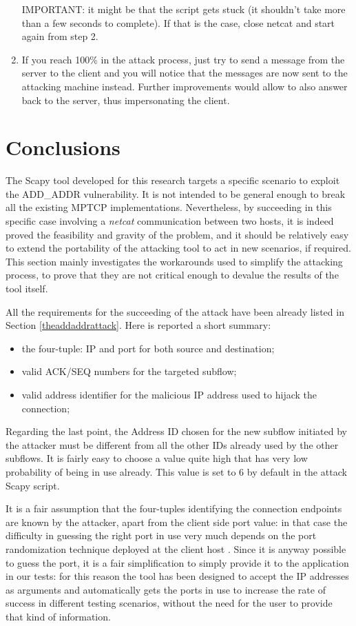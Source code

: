 \begin{enumerate}
    IMPORTANT: it might be that the script gets stuck (it shouldn't take more than a few seconds to complete). If that is the case, close netcat and start again from step 2.
\item
    If you reach 100\% in the attack process, just try to send a message from the server to the client and you will notice that the messages are now sent to the attacking machine instead. Further improvements would allow to also answer back to the server, thus impersonating the client.
\end{enumerate} 


\section{Conclusions} 
\label{limitationsandfuturework}
The Scapy tool developed for this research targets a specific scenario to exploit the ADD\_ADDR vulnerability. It is not intended to be general enough to break all the existing MPTCP implementations. Nevertheless, by succeeding in this specific case involving a \textit{netcat} communication between two hosts, it is indeed proved the feasibility and gravity of the problem, and it should be relatively easy to extend the portability of the attacking tool to act in new scenarios, if required.
This section mainly investigates the workarounds used to simplify the attacking process, to prove that they are not critical enough to devalue the results of the tool itself.

All the requirements for the succeeding of the attack have been already listed in Section \ref{theaddaddrattack}. Here is reported a short summary:

\begin{itemize}  
\item the four-tuple: IP and port for both source and destination;
\item valid ACK/SEQ numbers for the targeted subflow;
\item valid address identifier for the malicious IP address used to hijack the connection;
\end{itemize}

Regarding the last point, the Address ID chosen for the new subflow initiated by the attacker must be different from all the other IDs already used by the other subflows. It is fairly easy to choose a value quite high that has very low probability of being in use already. This value is set to 6 by default in the attack Scapy script.

It is a fair assumption that the four-tuples identifying the connection endpoints are known by the attacker, apart from the client side port value: in that case the difficulty in guessing the right port in use very much depends on the port randomization technique deployed at the client host . Since it is anyway possible to guess the port, it is a fair simplification to simply provide it to the application in our tests: for this reason the tool has been designed to accept the IP addresses as arguments and automatically gets the ports in use to increase the rate of success in different testing scenarios, without the need for the user to provide that kind of information.

